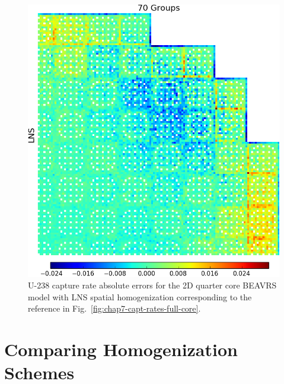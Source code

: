\begin{appendices}
\begin{figure}[h!]
\centering
\includegraphics[width=\linewidth]{figures/patterns/appendix/full-core/capt-err-lns-magnitude}
\vspace{2mm}
\caption[U-238 capture rate absolute errors for BEAVRS]{U-238 capture rate absolute errors for the 2D quarter core \ac{BEAVRS} model with \ac{LNS} spatial homogenization corresponding to the reference in Fig.~\ref{fig:chap7-capt-rates-full-core}.}
\label{fig:lns-full-core-capt-err-abs}
\end{figure}

\clearpage


\chapter{Comparing Homogenization Schemes}
\label{sec:compare-schemes}


\end{appendices}
